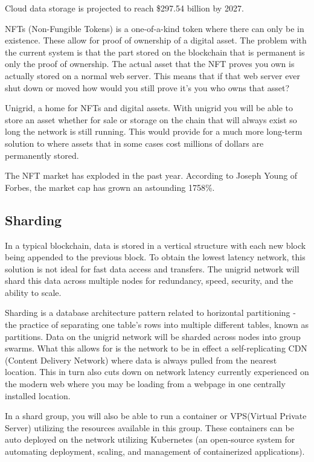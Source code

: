 \documentclass[12pt]{article}
\begin{document}
Cloud data storage is projected to reach \$297.54 billion by 2027\cite{fort2021}.

NFTs (Non-Fungible Tokens) is a one-of-a-kind token where there can only be in existence. These allow for proof of ownership of a digital asset. The problem with the current system is that the part stored on the blockchain that is permanent is only the proof of ownership. The actual asset that the NFT proves you own is actually stored on a normal web server. This means that if that web server ever shut down or moved how would you still prove it's you who owns that asset?

Unigrid, a home for NFTs and digital assets. With unigrid you will be able to store an asset whether for sale or storage on the chain that will always exist so long the network is still running. This would provide for a much more long-term solution to where assets that in some cases cost millions of dollars are permanently stored.

The NFT market has exploded in the past year. According to Joseph Young of Forbes, the market cap has grown an astounding 1758\%\cite{young2021}.


\subsection*{Sharding}
In a typical blockchain, data is stored in a vertical structure with each new block being appended to the previous block. To obtain the lowest latency network, this solution is not ideal for fast data access and transfers. The unigrid network will shard this data across multiple nodes for redundancy, speed, security, and the ability to scale.

Sharding is a database architecture pattern related to horizontal partitioning - the practice of separating one table’s rows into multiple different tables, known as partitions\cite{mark2019}. Data on the unigrid network will be sharded across nodes into group swarms. What this allows for is the network to be in effect a self-replicating CDN (Content Delivery Network) where data is always pulled from the nearest location. This in turn also cuts down on network latency currently experienced on the modern web where you may be loading from a webpage in one centrally installed location.

In a shard group, you will also be able to run a container or VPS(Virtual Private Server) utilizing the resources available in this group. These containers can be auto deployed on the network utilizing Kubernetes (an open-source system for automating deployment, scaling, and management of containerized applications).
\end{document}
